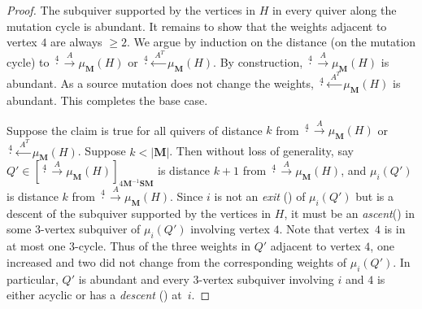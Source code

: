 \documentclass[11pt, letterpaper]{amsart}
\theoremstyle{definition}
\numberwithin{equation}{section}
\begin{document}
\begin{proof}
The subquiver supported by the vertices in $H$ in every quiver along the mutation cycle is abundant.
It remains to show that the weights adjacent to vertex $4$ are always $\geq 2$.
We argue by induction on the distance (on the mutation cycle) to $\stackrel{4}{\cdot} \stackrel{A}{\rightarrow} \mu_{\mathbf M}(H)$ or $\stackrel{4}{\cdot} \stackrel{\hspace{3pt} A^T}{\leftarrow} \mu_{\mathbf M}(H)$.
By construction, $\stackrel{4}{\cdot} \stackrel{A}{\rightarrow} \mu_{\mathbf M}(H)$ is abundant. As a source mutation does not change the weights, $\stackrel{4}{\cdot} \stackrel{\hspace{3pt} A^T}{\leftarrow} \mu_{\mathbf M}(H)$ is abundant. This completes the base case.

Suppose the claim is true for all quivers of distance $k$ from $\stackrel{4}{\cdot} \stackrel{A}{\rightarrow} \mu_{\mathbf M}(H)$ or~${\stackrel{4}{\cdot} \stackrel{\hspace{3pt} A^T}{\leftarrow} \mu_{\mathbf M}(H)}$. Suppose $k < |\mathbf M|$.
Then without loss of generality, say $Q'\in [\stackrel{4}{\cdot} \stackrel{A}{\rightarrow} \mu_{\mathbf M}(H)]_{4 \mathbf M^{-1} \mathbf S \mathbf M}$ is distance $k+1$ from $\stackrel{4}{\cdot} \stackrel{A}{\rightarrow} \mu_{\mathbf M}(H)$, and $\mu_i(Q')$ is distance $k$ from $\stackrel{4}{\cdot} \stackrel{A}{\rightarrow} \mu_{\mathbf M}(H)$.
Since $i$ is not an \emph{exit} (\cite[Definition~6.10]{LMC}) of $\mu_i(Q')$ but is a descent of the subquiver supported by the vertices in $H$, it must be an \emph{ascent}(\cite[Definition~3.3]{LMC}) in some $3$-vertex subquiver of $\mu_i(Q')$ involving vertex $4$.
Note that vertex~$4$ is in at most one $3$-cycle.
Thus of the three weights in $Q'$ adjacent to vertex $4$, one increased and two did not change from the corresponding weights of $\mu_i(Q')$. 
In particular, $Q'$ is abundant and every $3$-vertex subquiver involving $i$ and $4$ is either acyclic or has a \emph{descent} (\cite[Definition~3.3]{LMC}) at~$i$.


\end{proof}
\end{document}
